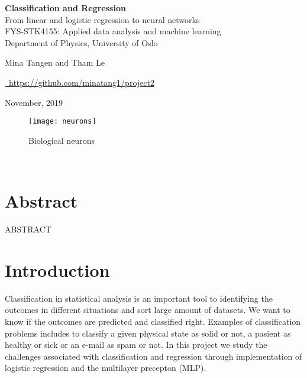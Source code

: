 \documentclass[11pt,english, A4]{article}
\begin{document}
\begin{center}
\Huge \textbf{Classification and Regression}\\
\Large{From linear and logistic regression to neural networks}\\
\vspace{6mm}
\small{FYS-STK4155: Applied data analysis and machine learning}\\
\small{Department of Physics, University of Oslo}

\vspace{6mm}
\Large {Mina Tangen and Tham Le}
\vspace{2mm}

\faGithub\href{https://github.com/}{\  https://github.com/minatang1/project2} 


\thispagestyle{empty}
\end{center}

\begin{flushright}
\small November, 2019
\end{flushright}

\begin{figure}[H]
  \texttt{[image: neurons]}
  \caption{Biological neurons}
  \label{fig:biological neurons}
\end{figure}

\pagebreak
\newpage~\newpage

\section*{Abstract}
ABSTRACT



\newpage


{
  \hypersetup{linkcolor=black}
  \tableofcontents
}

\newpage
\section{Introduction}
Classification in statistical analysis is an important tool to identifying the outcomes in different situations and sort large amount of datasets. We want to know if the outcomes are predicted and classified right. Examples of classification problems includes to classify  a given physical state as solid or not, a pasient as healthy or sick or an e-mail as spam or not. In this project we study the challenges associated with classification and regression through implementation of logistic regression and the multilayer precepton (MLP). \\
\end{document}
